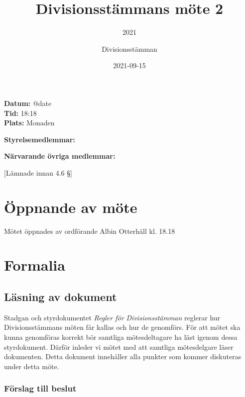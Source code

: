 \documentclass[protokoll]{dvd}
\begin{document}
\title{Divisionsstämmans möte 2}
\subtitle{2021}
\author{Divisionsstämman}
\date{2021-09-15}

\textbf{Datum:} \csname @date\endcsname\\
\textbf{Tid:} 18:18\\
\textbf{Plats:} Monaden

\textbf{Styrelsemedlemmar:}
\begin{närvarande_förtroendevalda}
\end{närvarande_förtroendevalda}

\textbf{Närvarande övriga medlemmar:}
\begin{närvarande_medlemmar}
	[Lämnade innan 4.6 §]
\end{närvarande_medlemmar}

\section{Öppnande av möte}

Mötet öppnades av ordförande Albin Otterhäll kl. 18.18

\newpage
\section{Formalia}

\subsection{Läsning av dokument}

Stadgan och styrdokumentet \emph{Regler för Divisionsstämman} reglerar hur Divisionsstämmans möten får kallas och hur de genomförs.
För att mötet ska kunna genomföras korrekt bör samtliga mötesdeltagare ha läst igenom dessa styrdokument.
Därför inleder vi mötet med att samtliga mötesdelgare läser dokumenten.
Detta dokument innehåller alla punkter som kommer diskuteras under detta möte.

\subsubsection*{Förslag till beslut}
\end{document}
